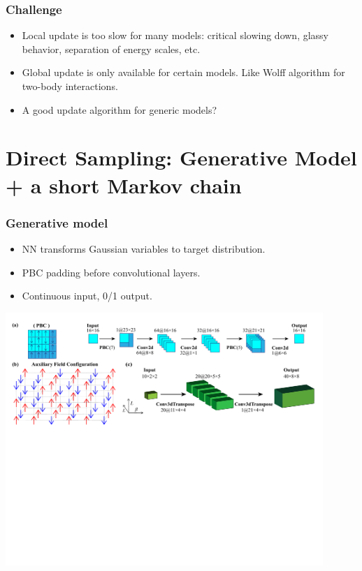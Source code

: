 \documentclass[xcolor=table, 10pt, aspectratio=169, ignorenonframetext]{beamer}
\begin{document}
\begin{frame}
  \frametitle{Challenge}
  \begin{itemize}
    \item Local update is too slow for many models: critical slowing down, glassy behavior, separation of energy scales, etc.
    \item Global update is only available for certain models. Like Wolff algorithm for two-body interactions.
    \item A good update algorithm for generic models?
  \end{itemize}
\end{frame}

\section{Direct Sampling: Generative Model + a short Markov chain}

\begin{frame}
  \frametitle{Generative model}
  \begin{itemize}
  \item NN transforms Gaussian variables to target distribution.
  \item PBC padding before convolutional layers.
  \item Continuous input, 0/1 output.
  \end{itemize}
  \begin{center}
    \includegraphics[viewport=0 270 1250 450,clip,width=12cm]{nn-model}    
  \end{center}
\end{frame}
\end{document}
